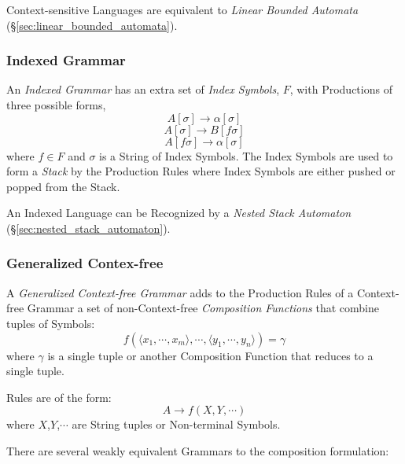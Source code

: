Context-sensitive Languages are equivalent to \emph{Linear
Bounded Automata} (\S\ref{sec:linear_bounded_automata}).



\subsubsection{Indexed Grammar}\label{subsubsection:indexed_grammar}

An \emph{Indexed Grammar} has an extra set of \emph{Index Symbols},
$F$, with Productions of three possible forms,
\[
    A[\sigma] \rightarrow \alpha[\sigma]
\]\[
    A[\sigma] \rightarrow B[f\sigma]
\]\[
    A[f\sigma] \rightarrow \alpha[\sigma]
\]
where $f \in F$ and $\sigma$ is a String of Index Symbols. The Index
Symbols are used to form a \emph{Stack} by the Production Rules where
Index Symbols are either pushed or popped from the Stack.

An Indexed Language can be Recognized by a \emph{Nested Stack
  Automaton} (\S\ref{sec:nested_stack_automaton}).\cite{aho69}



\subsubsection{Generalized Contex-free}\label{sec:generalized_context_free}

A \emph{Generalized Context-free Grammar} adds to the Production Rules
of a Context-free Grammar a set of non-Context-free \emph{Composition
  Functions} that combine tuples of Symbols:
\[
    f(\langle x_1,\cdots,x_m\rangle,\cdots,\langle
    y_1,\cdots,y_n\rangle)=\gamma
\]
where $\gamma$ is a single tuple or another Composition Function that
reduces to a single tuple.

Rules are of the form:
\[
    A \rightarrow f(X,Y,\cdots)
\]
where $X$,$Y$,$\cdots$ are String tuples or Non-terminal Symbols.

There are several weakly equivalent Grammars to the composition
formulation:

